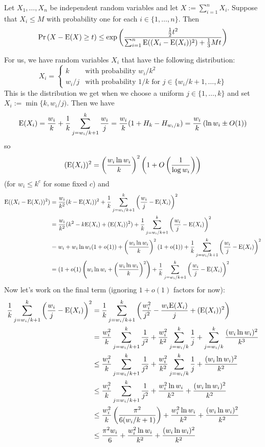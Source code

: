 \documentclass[kpfonts]{patmorin}
\begin{document}
\begin{thm}
  Let $X_1,\ldots,X_n$ be independent random variables and let $X:=\sum_{i=1}^n X_i$. Suppose that $X_i\le M$ with probability one for each $i\in\{1,\ldots,n\}$.  Then
  \[
    \Pr\left(X-\mathrm{E}(X) \ge t\right)
      \le \exp\left(\frac{\tfrac{1}{2}t^2}{\sum_{i=1}^n \mathrm{E}((X_i-\mathrm{E}(X_i))^2)+\tfrac{1}{3}Mt}\right)
  \]
\end{thm}
For us, we have random variables $X_i$ that have the following distribution:
\[
  X_i = \begin{cases}
          k & \text{with probability $w_i/k^2$} \\
          w_i/j & \text{with probability $1/k$ for $j\in\{w_i/k+1,\ldots,k\}$}
        \end{cases}
\]
This is the distribution we get when we choose a uniform $j\in\{1,\ldots,k\}$ and set $X_i:=\min\{k,w_i/j)$.
Then we have
\[
  \mathrm{E}(X_i)=\frac{w_i}{k} + \frac{1}{k}\sum_{j=w_i/k+1}^k \frac{w_i}{j}
  = \frac{w_i}{k}(1+H_{k}-H_{w_i/k}) = \frac{w_i}{k}\left(\ln w_i \pm O(1) \right)
\]
so
\[
  (\mathrm{E}(X_i))^2 = \left(\frac{w_i\ln w_i}{k}\right)^2\left(1+O\left(\frac{1}{\log w_i}\right)\right)
\]
(for $w_i\le k^c$ for some fixed $c$)
and
\begin{align*}
  \mathrm{E}((X_i-\mathrm{E}(X_i))^2)
  & = \frac{w_i}{k^2}(k-\mathrm{E}(X_i))^2
    + \frac{1}{k}\sum_{j=w_i/k+1}^k \left(\frac{w_i}{j}-\mathrm{E}(X_i)\right)^2 \\
  & = \frac{w_i}{k^2}(k^2-k\mathrm{E}(X_i)+(\mathrm{E}(X_i))^2)
    + \frac{1}{k}\sum_{j=w_i/k+1}^k \left(\frac{w_i}{j}-\mathrm{E}(X_i)\right)^2 \\
  & = w_i + w_i\ln w_i(1+o(1)) + \left(\frac{w_i\ln w_i}{k}\right)^2(1+o(1))
    + \frac{1}{k}\sum_{j=w_i/k+1}^k \left(\frac{w_i}{j}-\mathrm{E}(X_i)\right)^2 \\
  & = (1+o(1)\left(w_i\ln w_i + \left(\frac{w_i\ln w_i}{k}\right)^2\right)
    + \frac{1}{k}\sum_{j=w_i/k+1}^k \left(\frac{w_i}{j}-\mathrm{E}(X_i)\right)^2
\end{align*}
Now let's work on the final term (ignoring $1+o(1)$ factors for now):
\begin{align*}
\frac{1}{k}\sum_{j=w_i/k+1}^k \left(\frac{w_i}{j}-\mathrm{E}(X_i)\right)^2
 & = \frac{1}{k}\sum_{j=w_i/k+1}^k \left(\frac{w_i^2}{j^2}-\frac{w_i \mathrm{E}(X_i)}{j} + (\mathrm{E}(X_i))^2\right) \\
 & = \frac{w_i^2}{k}\sum_{j=w_i/k+1}^k\frac{1}{j^2}
   + \frac{w_i^2}{k^2}\sum_{j=w_i/k}^k\frac{1}{j} + \sum_{j=w_i/k}^k\frac{(w_i\ln w_i)^2}{k^3} \\
 & \le \frac{w_i^2}{k}\sum_{j=w_i/k+1}^k\frac{1}{j^2}
   + \frac{w_i^2}{k^2}\sum_{j=w_i/k}^k\frac{1}{j} + \frac{(w_i\ln w_i)^2}{k^2}\\
 & \le \frac{w_i^2}{k}\sum_{j=w_i/k+1}^k\frac{1}{j^2}
    + \frac{w_i^2\ln w_i}{k^2} + \frac{(w_i\ln w_i)^2}{k^2} \\
 & \le \frac{w_i^2}{k}\left(\frac{\pi^2}{6(w_i/k+1)}\right)
    + \frac{w_i^2\ln w_i}{k^2} + \frac{(w_i\ln w_i)^2}{k^2} \\
  & \le \frac{\pi^2 w_i}{6}
     + \frac{w_i^2\ln w_i}{k^2} + \frac{(w_i\ln w_i)^2}{k^2} \\
\end{align*}
\end{document}
